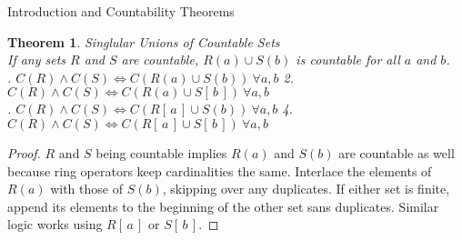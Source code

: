 \documentclass[12pt]{article}
\newtheorem{thm}{Theorem}
\begin{document}
\begin{section}{Introduction and Countability Theorems}
	\begin{thm}\label{thm:finite unions}
		\emph{
			Singlular Unions of Countable Sets\\
			\indent If any sets $R$ and $S$ are countable, $R(a)\cup S(b)$ is countable
			for all $a$ and $b$.\vspace{0.4em}\\
			. $C(R)\land C(S)\iff C(R\left(a\right)\cup S\left(b\right))~\forall a,b$
			\hspace{1em}
			2. $C(R)\land C(S)\iff C(R\left(a\right)\cup S[\,b\,])~\forall a,b$\\
			. $C(R)\land C(S)\iff C(R[\,a\,]\cup S\left(b\right))~\forall a,b$
			\hspace{1em}
			4. $C(R)\land C(S)\iff C(R[\,a\,]\cup S[\,b\,])~\forall a,b$
		}
	\end{thm}\begin{proof}
		$R$ and $S$ being countable implies $R(a)$ and $S(b)$ are countable as well
		because ring operators keep cardinalities the same. Interlace the elements of
		$R(a)$ with those of $S(b)$, skipping over any duplicates. If either set is
		finite, append its elements to the beginning of the other set sans duplicates.
		Similar logic works using $R[\,a\,]$ or $S[\,b\,]$.
	\end{proof}


\end{section}
\end{document}
